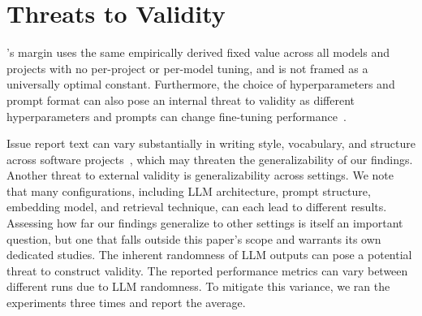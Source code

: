 
\section{Threats to Validity}
\label{sec:threats}

\bragtag's margin uses the same empirically derived fixed value across all models and projects with no per-project or per-model tuning, and is not framed as a universally optimal constant. Furthermore, the choice of hyperparameters and prompt format can also pose an internal threat to validity as different hyperparameters and prompts can change fine-tuning performance~\cite{heo2025study,aracena2025applying}. 



Issue report text can vary substantially in writing style, vocabulary, and structure across software projects~\cite{akhavan2026linkanchorautonomousllmbasedagent}, which may threaten the generalizability of our findings.
Another threat to external validity is generalizability across settings. We note that many configurations, including LLM architecture, prompt structure, embedding model, and retrieval technique, can each lead to different results. Assessing how far our findings generalize to other settings is itself an important question, but one that falls outside this paper's scope and warrants its own dedicated studies.
The inherent randomness of LLM outputs can pose a potential threat to construct validity. The reported performance metrics can vary between different runs due to LLM randomness. To mitigate this variance, we ran the experiments three times and report the average.

